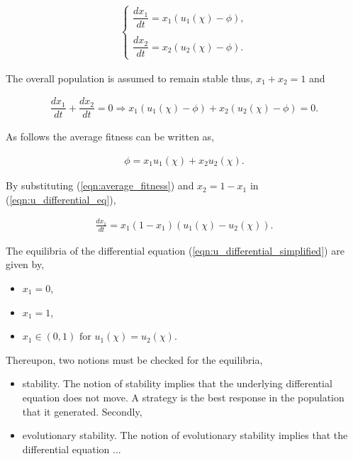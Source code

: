 \documentclass[10pt]{article}
\begin{document}
\begin{eqnarray}
	\label{eqn:u_differential_eq}
	\left\{
	\begin{array}{cl}
	\dfrac{dx_1}{dt}=x_1(u_1(\chi)-\phi),
	\\
	\\
	\dfrac{dx_2}{dt}= x_2(u_2(\chi)-\phi).
	\end{array} \right.
\end{eqnarray}

The overall population is assumed to remain stable thus, \(x_1 + x_2 = 1 \)
and

\begin{eqnarray}
	\dfrac{dx_1}{dt}  + \dfrac{dx_2}{dt} = 0 \Rightarrow x_1(u_1(\chi) - \phi)
	 + x_2(u_2(\chi) - \phi)=0.
\end{eqnarray} 

As follows the average fitness can be written as,

\begin{eqnarray}
\label{eqn:average_fitness}
	\phi=x_1u_1(\chi) + x_2u_2(\chi).
\end{eqnarray}

By substituting (\ref{eqn:average_fitness}) and \(x_2= 1 - x_1\) in (\ref{eqn:u_differential_eq}),

\begin{eqnarray}
	\label{eqn:u_differential_simplified}
	\frac{dx_1}{dt}= x_1(1 - x_1)(u_1(\chi) - u_2(\chi)).
\end{eqnarray}

The equilibria of the differential equation (\ref{eqn:u_differential_simplified})
are given by,

\begin{itemize}
	\item \(x_1=0\),
	\item \(x_1=1\),
	\item \(x_1 \in (0, 1) \mbox{ for } u_1(\chi)=u_2(\chi)\).
\end{itemize}

Thereupon, two notions must be checked for the equilibria,

\begin{itemize}
	\item stability. The notion of stability implies that the underlying differential
	equation does not move. A strategy is the best response in the population
	that it generated. Secondly, 
	\item evolutionary stability. The notion of evolutionary stability implies
	that the  differential equation ...
\end{itemize}
\end{document}
